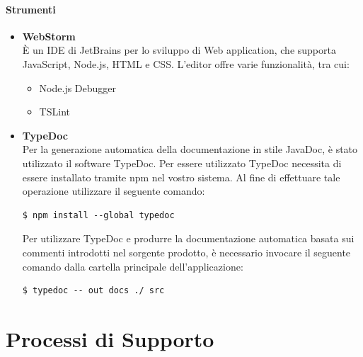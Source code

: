 \documentclass[11pt,a4paper]{article}
\begin{document}
{	\paragraph{Strumenti}
	\begin{itemize}
		\item{\textbf{WebStorm}} \noindent \\
		È un IDE di JetBrains per lo sviluppo di Web application, che supporta JavaScript, Node.js, HTML e CSS.
		L'editor offre varie funzionalità, tra cui:
		\begin{itemize}
			\item Node.js Debugger
			\item TSLint
		\end{itemize}
		
		\item{\textbf{TypeDoc}}
		\noindent \\
		Per la generazione automatica della documentazione in stile JavaDoc, è stato utilizzato il software TypeDoc. Per essere utilizzato TypeDoc necessita di essere installato tramite npm nel vostro sistema. Al fine di effettuare tale operazione utilizzare il seguente comando:
		
		\begin{center}
			\begin{minipage}{.5\textwidth}
				\begin{lstlisting}[caption=Installazione di TypeDoc,numbers=none]
				$ npm install --global typedoc
				\end{lstlisting}
			\end{minipage}	
		\end{center}	
		
		Per utilizzare TypeDoc e produrre la documentazione automatica basata sui commenti introdotti nel sorgente prodotto, è necessario invocare il seguente comando dalla cartella principale dell’applicazione:
		
		\begin{center}
			\begin{minipage}{.5\textwidth}
				\begin{lstlisting}[caption=Installazione di TSLint,numbers=none]
				$ typedoc -- out docs ./ src
				\end{lstlisting}
			\end{minipage}	
		\end{center}		
	\end{itemize}

	
	\newpage
	\section{Processi di Supporto}
}
\end{document}
